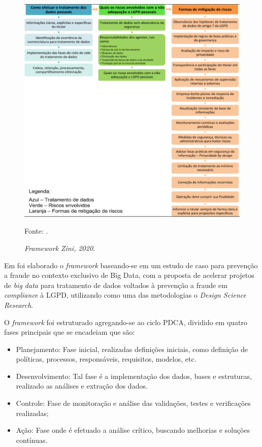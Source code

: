 \documentclass[
	12pt,				%
	openright,			%
	oneside,			%
	a4paper,			%
	english,			%
	french,				%
	spanish,			%
	brazil,				%
	]{abntex2}
\begin{document}
\begin{figure}[ht]
    \centering
    \caption{\textit{Framework Zini, 2020}.}
    \includegraphics[width=4.9in]{Images/11Zini.png}
    \label{fig: zini}
    
    \centering \small Fonte: \cite{Zini2020}.
\end{figure}

\pagebreak


Em  foi elaborado o \textit{framework}  baseando-se em um estudo de caso para prevenção a fraude no contexto exclusivo de Big Data, com a proposta de acelerar projetos de \textit{big data} para tratamento de dados voltados à prevenção a fraude em \textit{compliance} à LGPD, utilizando como uma das metodologias o \textit{Design Science Research}.

O \textit{framework}  foi estruturado agregando-se ao ciclo PDCA, dividido em quatro fases principais que se encadeiam que são:

\begin{itemize}
\item Planejamento: Fase inicial, realizadas definições iniciais, como definição de políticas, processos, responsáveis, requisitos, modelos, etc.
\item Desenvolvimento: Tal fase é a implementação dos dados, bases e estruturas, realizado as análises e extração dos dados.
\item Controle: Fase de monitoração e análise das validações, testes e verificações realizadas;
\item Ação: Fase onde é efetuado a análise crítico, buscando melhorias e soluções contínuas.
\end{itemize}
\end{document}
